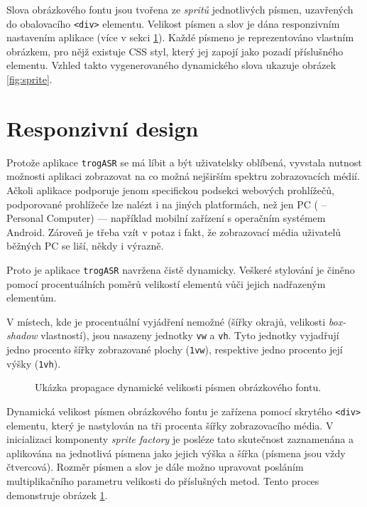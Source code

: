 Slova obrázkového fontu jsou tvořena ze {\sl spritů} jednotlivých písmen, uzavřených do obalovacího \verb|<div>| elementu. Velikost písmen a slov je dána responzivním nastavením aplikace (více v sekci \ref{sec:responsive}). Každé písmeno je reprezentováno vlastním obrázkem, pro nějž existuje CSS styl, který jej zapojí jako pozadí příslušného elementu. Vzhled takto vygenerovaného dynamického slova ukazuje obrázek \ref{fig:sprite}.

\section{Responzivní design}
\label{sec:responsive}

Protože aplikace \verb|trogASR| se má líbit a být uživatelsky oblíbená, vyvstala nutnost možnosti aplikaci zobrazovat na co možná nejširším spektru zobrazovacích médií. Ačkoli aplikace podporuje jenom specifickou podsekci webových prohlížečů, podporované prohlížeče lze nalézt i na jiných platformách, než jen PC ( -- Personal Computer) --- například mobilní zařízení s operačním systémem Android. Zároveň je třeba vzít v potaz i fakt, že zobrazovací média uživatelů běžných PC se liší, někdy i výrazně.

Proto je aplikace \verb|trogASR| navržena čistě dynamicky. Veškeré stylování je činěno pomocí procentuálních poměrů velikostí elementů vůči jejich nadřazeným elementům. 

V místech, kde je procentuální vyjádření nemožné (šířky okrajů, velikosti {\sl box-shadow} vlastností), jsou nasazeny jednotky \verb|vw| a \verb|vh|. Tyto jednotky vyjadřují jedno procento šířky zobrazované plochy (\verb|1vw|), respektive jedno procento její výšky (\verb|1vh|).
\\
\begin{figure}[h]
	
	\caption{Ukázka propagace dynamické velikosti písmen obrázkového fontu.}
	\label{fig:responsive}
\end{figure}

Dynamická velikost písmen obrázkového fontu je zařízena pomocí skrytého \verb|<div>| elementu, který je nastylován na tři procenta šířky zobrazovacího média. V inicializaci komponenty {\sl sprite factory} je posléze tato skutečnost zaznamenána a aplikována na jednotlivá písmena jako jejich výška a šířka (písmena jsou vždy čtvercová). Rozměr písmen a slov je dále možno upravovat posláním multiplikačního parametru velikosti do příslušných metod. Tento proces demonstruje obrázek \ref{fig:responsive}.

